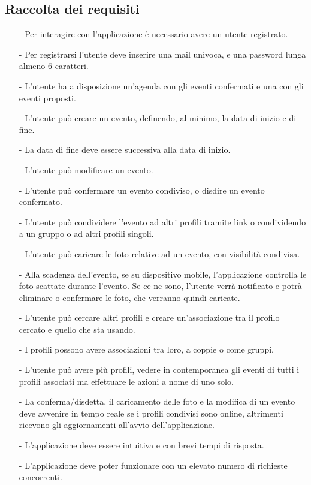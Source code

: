 \newpage

\subsection{Raccolta dei requisiti}

\begin{itemize}
  \item[-] Per interagire con l’applicazione è necessario avere un utente registrato.
  \item[-] Per registrarsi l’utente deve inserire una mail univoca, e una password lunga almeno 6 caratteri.
  \item[-] L’utente ha a disposizione un’agenda con gli eventi confermati e una con gli eventi proposti.
  \item[-] L’utente può creare un evento, definendo, al minimo, la data di inizio e di fine.
  \item[-] La data di fine deve essere successiva alla data di inizio.
  \item[-] L’utente può modificare un evento.
  \item[-] L’utente può confermare un evento condiviso, o disdire un evento confermato.
  \item[-] L’utente può condividere l’evento ad altri profili tramite link o condividendo a un gruppo o ad altri profili singoli.
  \item[-] L’utente può caricare le foto relative ad un evento, con visibilità condivisa.
  \item[-] Alla scadenza dell’evento, se su dispositivo mobile, l’applicazione controlla le foto scattate durante l’evento. Se ce ne sono, l’utente verrà notificato e potrà eliminare o confermare le foto, che verranno quindi caricate.
  \item[-] L’utente può cercare altri profili e creare un’associazione tra il profilo cercato e quello che sta usando.
  \item[-] I profili possono avere associazioni tra loro, a coppie o come gruppi.
  \item[-] L’utente può avere più profili, vedere in contemporanea gli eventi di tutti i profili associati ma effettuare le azioni a nome di uno solo.
  \item[-] La conferma/disdetta, il caricamento delle foto e la modifica di un evento deve avvenire in tempo reale se i profili condivisi sono online, altrimenti ricevono gli aggiornamenti all’avvio dell’applicazione.
  \item[-] L'applicazione deve essere intuitiva e con brevi tempi di risposta.
  \item[-] L'applicazione deve poter funzionare con un elevato numero di richieste concorrenti.
\end{itemize}


